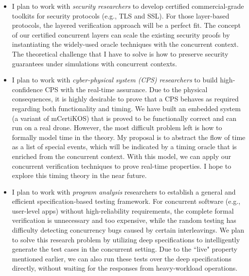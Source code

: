 \documentclass[a4paper, 10pt]{article}
\begin{document}
\begin{small}
\begin{itemize}
\item I plan to work with \emph{security researchers}
to  develop certified 
commercial-grade toolkits for security
protocols (e.g., TLS and SSL). 
For those layer-based protocols, the layered verification approach will be a perfect fit.
The concept of our certified concurrent  layers can scale the existing security proofs by instantiating the widely-used oracle techniques
with the concurrent context. The theoretical challenge that I have to solve is
how to preserve security guarantees under simulations with concurrent contexts.

\item I plan to work with
\emph{cyber-physical system (CPS) researchers} to build
high-confidence CPS with the real-time assurance.
Due to the physical consequences, it is highly desirable to
prove that a CPS behaves as required regarding both functionality and timing. 
We have built an embedded system (a variant of mCertiKOS) that is proved to be functionally correct and can run on a real drone. However, the most difficult problem left is how to formally
model  time in the theory. My proposal is to abstract the flow of time  as a list of special events, which will be indicated by a timing oracle that is enriched from the concurrent context.
With this model, we can apply 
our concurrent verification techniques to prove
 real-time properties. I hope to explore this timing theory in the near future.
 
\begin{comment}
However, it is still a big challenge on how to formally model the time. We believe that the cure is still the event-based concurrent context.  
I am looking forward to exploring this huge research opportunity when combining the formal verification with CPS.
\end{comment}

\item I plan to work with
\emph{program analysis} researchers to establish a general and efficient specification-based testing framework.
For concurrent software (e.g., user-level apps) without high-reliability requirements, 
the complete formal verification is unnecessary and too expensive,
while the
random testing has difficulty detecting concurrency bugs caused by certain interleavings.
We plan to solve this research problem by utilizing deep specifications to intelligently generate the test cases
 in the concurrent setting. Due to the ``live" property mentioned earlier, we can also run these tests  over the deep specifications directly, without waiting for the responses from heavy-workload operations. 


\end{itemize}
\end{small}
\end{document}
